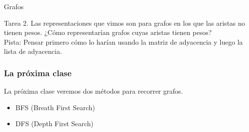 \documentclass{beamer}
\begin{document}
\begin{section}{Grafos}
\begin{frame}
		\begin{alertblock}{Tarea 2.}
			Las representaciones que vimos son para grafos en los que las aristas no tienen pesos. ¿Cómo representarían grafos cuyas aristas tienen pesos?\\
			Pista: Pensar primero cómo lo harían usando la matriz de adyacencia y luego la lista de adyacencia.
		\end{alertblock}
	\end{frame}
	
	\begin{frame}
		\frametitle{La próxima clase}
		La próxima clase veremos dos métodos para recorrer grafos.
		\begin{itemize}
			\item {BFS (Breath First Search)}
			\item {DFS (Depth First Search)}
		\end{itemize}
	\end{frame}
	
	
\end{section}
\end{document}
